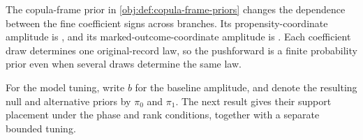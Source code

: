 The copula-frame prior  in \cref{obj:def:copula-frame-priors} changes the dependence between the fine coefficient signs across branches. Its propensity-coordinate amplitude is , and its marked-outcome-coordinate amplitude is . Each coefficient draw determines one original-record law, so the pushforward is a finite probability prior even when several draws determine the same law.

For the model tuning, write \(b\) for the baseline amplitude, and denote the resulting null and alternative priors by \(\pi_0\) and \(\pi_1\). The next result gives their support placement under the phase and rank conditions, together with a separate bounded tuning.

